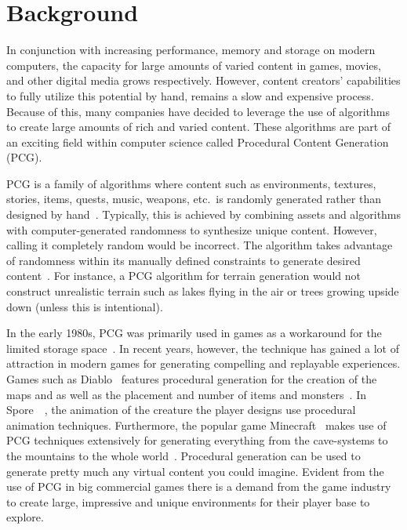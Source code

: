 \section{Background}

In conjunction with increasing performance, memory and storage on modern computers, the capacity for large amounts of varied content in games, movies, and other digital media grows respectively.
However, content creators' capabilities to fully utilize this potential by hand, remains a slow and expensive process.
Because of this, many companies have decided to leverage the use of algorithms to create large amounts of rich and varied content.
These algorithms are part of an exciting field within computer science called Procedural Content Generation (PCG).

PCG is a family of algorithms where content such as environments, textures, stories, items, quests, music, weapons, etc.\ is randomly generated rather than designed by hand~\cite[p.1]{PCG_in_games}.
Typically, this is achieved by combining assets and algorithms with computer-generated randomness to synthesize unique content.
However, calling it completely random would be incorrect.
The algorithm takes advantage of randomness within its manually defined constraints to generate desired content~\cite{Gamasutra}.
For instance, a PCG algorithm for terrain generation would not construct unrealistic terrain such as lakes flying in the air or trees growing upside down (unless this is intentional).
    
In the early 1980s, PCG was primarily used in games as a workaround for the limited storage space~\cite[p.4]{PCG_in_games}.
In recent years, however, the technique has gained a lot of attraction in modern games for generating compelling and replayable experiences.
Games such as Diablo~\cite{diablo} features procedural generation for the creation of the maps and as well as the placement and number of items and monsters~\cite[p.4]{PCG_in_games}.
In Spore~\cite{spore}~, the animation of the creature the player designs use procedural animation techniques\cite[p.4]{PCG_in_games}.
Furthermore, the popular game Minecraft~\cite{minecraft} makes use of PCG techniques extensively for generating everything from the cave-systems to the mountains to the whole world~\cite[p.4]{PCG_in_games}.
Procedural generation can be used to generate pretty much any virtual content you could imagine.
Evident from the use of PCG in big commercial games there is a demand from the game industry to create large, impressive and unique environments for their player base to explore.

